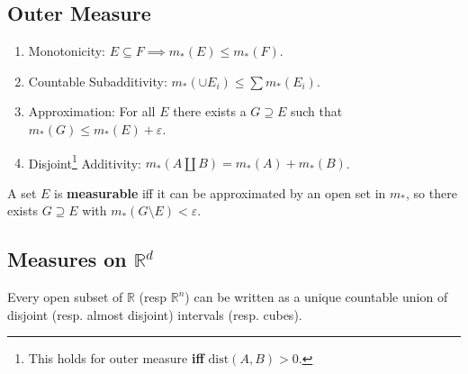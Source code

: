 \hypertarget{outer-measure}{%
\subsection{Outer Measure}\label{outer-measure}}

\begin{proposition}

\envlist

\begin{enumerate}
\def\labelenumi{\arabic{enumi}.}
\tightlist
\item
  Monotonicity: \(E\subseteq F \implies m_*(E) \leq m_*(F)\).
\item
  Countable Subadditivity: \(m_*(\cup E_{i}) \leq \sum m_*(E_{i})\).
\item
  Approximation: For all \(E\) there exists a \(G \supseteq E\) such
  that \(m_*(G) \leq m_*(E) + \varepsilon\).
\item
  Disjoint\footnote{This holds for outer measure \textbf{iff}
    \(\mathrm{dist}(A, B) > 0\).} Additivity:
  \(m_*(A {\textstyle\coprod}B) = m_*(A) + m_*(B)\).
\end{enumerate}

\end{proposition}

\begin{definition}

A set \(E\) is \textbf{measurable} iff it can be approximated by an open
set in \(m_*\), so there exists \(G\supseteq E\) with
\(m_*(G\setminus E) < {\varepsilon}\).

\end{definition}

\hypertarget{measures-on-mathbbrd}{%
\subsection{\texorpdfstring{Measures on
\({\mathbb{R}}^d\)}{Measures on \{\textbackslash mathbb\{R\}\}\^{}d}}\label{measures-on-mathbbrd}}

\begin{proposition}

Every open subset of \({\mathbb{R}}\) (resp \({\mathbb{R}}^n\)) can be
written as a unique countable union of disjoint (resp. almost disjoint)
intervals (resp. cubes).

\end{proposition}

